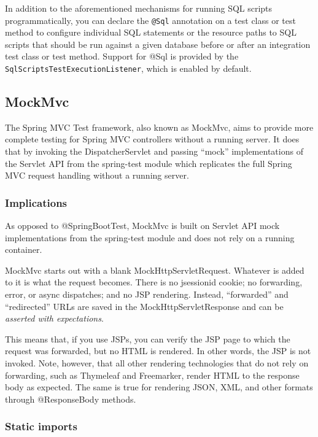 \documentclass{scrartcl}
\begin{document}
In addition to the aforementioned mechanisms for running SQL scripts programmatically, you can declare the \lstinline|@Sql| annotation on a test class or test method to configure individual SQL statements or the resource paths to SQL scripts that should be run against a given database before or after an integration test class or test method. Support for @Sql is provided by the \lstinline|SqlScriptsTestExecutionListener|, which is enabled by default.

\subsection{MockMvc}

The Spring MVC Test framework, also known as MockMvc, aims to provide more complete testing for Spring MVC controllers without a running server. It does that by invoking the DispatcherServlet and passing “mock” implementations of the Servlet API from the spring-test module which replicates the full Spring MVC request handling without a running server.

\subsubsection{Implications}

As opposed to @SpringBootTest, MockMvc is built on Servlet API mock implementations from the spring-test module and does not rely on a running container.

MockMvc starts out with a blank MockHttpServletRequest. Whatever is added to it is what the request becomes. There is no jsessionid cookie; no forwarding, error, or async dispatches; and no JSP rendering. Instead, “forwarded” and “redirected” URLs are saved in the MockHttpServletResponse and can be \textit{asserted with expectations}.

This means that, if you use JSPs, you can verify the JSP page to which the request was forwarded, but no HTML is rendered. In other words, the JSP is not invoked. Note, however, that all other rendering technologies that do not rely on forwarding, such as Thymeleaf and Freemarker, render HTML to the response body as expected. The same is true for rendering JSON, XML, and other formats through @ResponseBody methods.

\subsubsection{Static imports}
\end{document}
